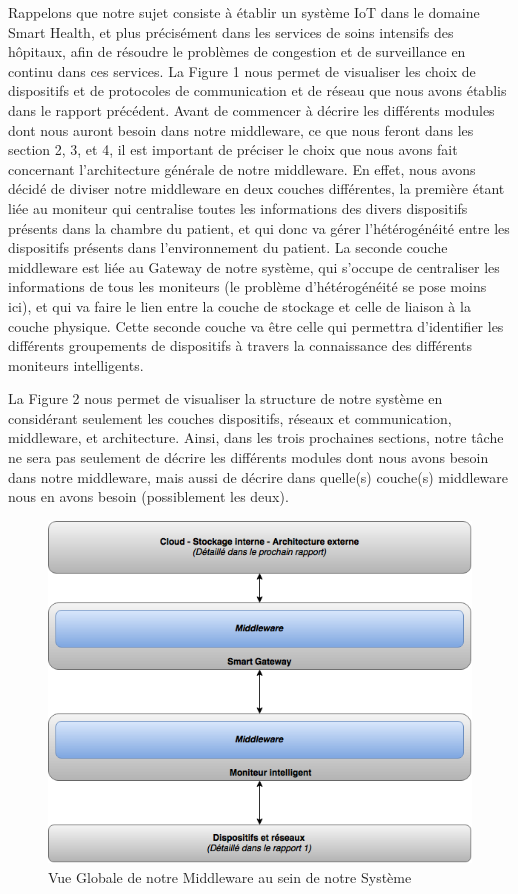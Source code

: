Rappelons que notre sujet consiste à établir un système IoT dans le domaine Smart Health, et plus précisément dans les services de soins intensifs des hôpitaux, afin de résoudre le problèmes de congestion et de surveillance en continu dans ces services. La Figure 1 nous permet de visualiser les choix de dispositifs et de protocoles de communication et de réseau que nous avons établis dans le rapport précédent. Avant de commencer à décrire les différents modules dont nous auront besoin dans notre middleware, ce que nous feront dans les section 2, 3, et 4, il est important de préciser le choix que nous avons fait concernant l’architecture générale de notre middleware. En effet, nous avons décidé de diviser notre middleware en deux couches différentes, la première étant liée au moniteur qui centralise toutes les informations des divers dispositifs présents dans la chambre du patient, et qui donc va gérer l’hétérogénéité entre les dispositifs présents dans l’environnement du patient. La seconde couche middleware est liée au Gateway de notre système, qui s’occupe de centraliser les informations de tous les moniteurs (le problème d’hétérogénéité se pose moins ici), et qui va faire le lien entre la couche de stockage et celle de liaison à la couche physique. Cette seconde couche va être celle qui permettra d’identifier les différents groupements de dispositifs à travers la connaissance des différents moniteurs intelligents.

La Figure 2 nous permet de visualiser la structure de notre système en considérant seulement les couches dispositifs, réseaux et communication, middleware, et architecture. Ainsi, dans les trois prochaines sections, notre tâche ne sera pas seulement de décrire les différents modules dont nous avons besoin dans notre middleware, mais aussi de décrire dans quelle(s) couche(s) middleware nous en avons besoin (possiblement les deux).

\begin{figure}[h!]
	\hspace*{-2.5cm}
	\centering
	\includegraphics[width=1.4\textwidth]{Figure2.png}
	\caption{Vue Globale de notre Middleware au sein de notre Système}
	\label{fig:balance}
\end{figure}
